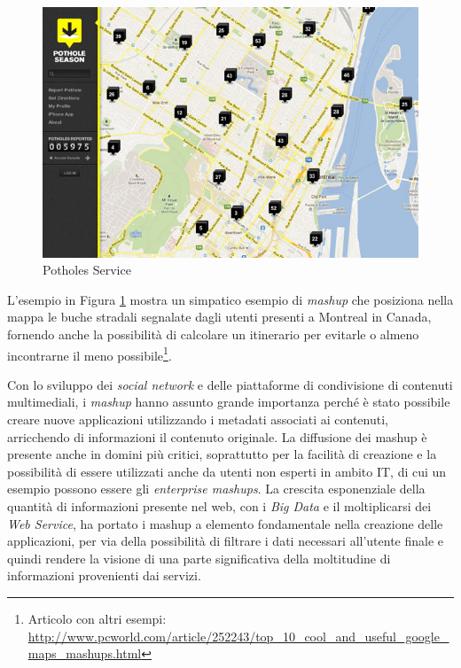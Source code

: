 \begin{figure}[ht]
	\centering
	\includegraphics[width=\textwidth]{2-preliminari/Immagini/potholes_service.jpg}
	\caption{Potholes Service}\label{fig:potholes}
\end{figure}

L'esempio in Figura \ref{fig:potholes} mostra un simpatico esempio di \emph{mashup} che posiziona nella mappa le buche stradali segnalate dagli utenti presenti a Montreal in Canada, fornendo anche la possibilità di calcolare un itinerario per evitarle o almeno incontrarne il meno possibile\footnote{Articolo con altri esempi: \url{http://www.pcworld.com/article/252243/top_10_cool_and_useful_google_maps_mashups.html}}. 

Con lo sviluppo dei \emph{social network} e delle piattaforme di condivisione di contenuti multimediali, i \emph{mashup} hanno assunto grande importanza perché è stato possibile creare nuove applicazioni utilizzando i metadati associati ai contenuti, arricchendo di informazioni il contenuto originale.
La diffusione dei mashup è presente anche in domini più critici, soprattutto per la facilità di creazione e la possibilità di essere utilizzati anche da utenti non esperti in ambito IT, di cui un esempio possono essere gli \emph{enterprise mashups}.
La crescita esponenziale della quantità di informazioni presente nel web, con i \emph{Big Data} e il moltiplicarsi dei \emph{Web Service}, ha portato i mashup a elemento fondamentale nella creazione delle applicazioni, per via della possibilità di filtrare i dati necessari all'utente finale e quindi rendere la visione di una parte significativa della moltitudine di informazioni provenienti dai servizi.


